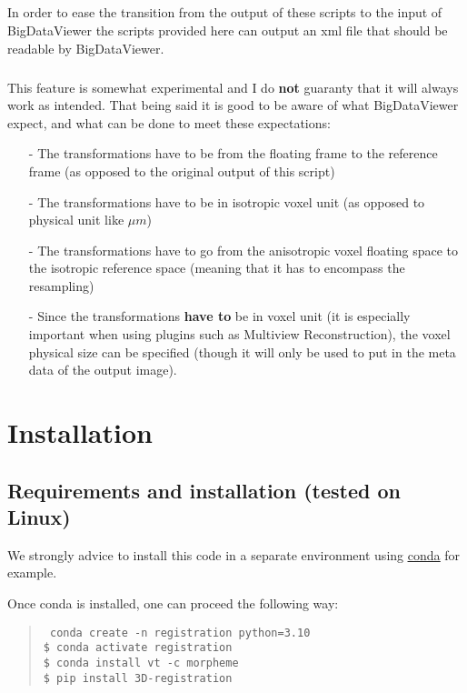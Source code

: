 \documentclass[10pt,a4paper]{book}
\newenvironment{code}[1]{\mbox{}\\[1ex]\hspace*{-#1cm}\begin{minipage}{150mm}\begin{quote}\tt}{\end{quote}\end{minipage}\mbox{}\\[1ex]}
\begin{document}
\paragraph{}In order to ease the transition from the output of these scripts to the input of BigDataViewer the scripts provided here can output an xml file that should be readable by BigDataViewer.
\paragraph{}This feature is somewhat experimental and I do \textbf{not} guaranty that it will always work as intended. That being said it is good to be aware of what BigDataViewer expect, and what can be done to meet these expectations:
\begin{itemize}
\item[-] The transformations have to be from the floating frame to the reference frame (as opposed to the original output of this script)
\item[-] The transformations have to be in isotropic voxel unit (as opposed to physical unit like $\mu m$)
\item[-] The transformations have to go from the anisotropic voxel floating space to the isotropic reference space (meaning that it has to encompass the resampling)
\item[-] Since the transformations \textbf{have to} be in voxel unit (it is especially important when using plugins such as Multiview Reconstruction), the voxel physical size can be specified (though it will only be used to put in the meta data of the output image).
\end{itemize}
\chapter{Installation}
\section{Requirements and installation (tested on Linux)}
We strongly advice to install this code in a separate environment using \underline{\href{https://conda.io/projects/conda/en/latest/user-guide/install/index.html}{conda}} for example.

Once conda is installed, one can proceed the following way:
\begin{code}{0.8}
\$ conda create -n registration python=3.10\\
\$ conda activate registration\\
\$ conda install vt -c morpheme\\
\$ pip install 3D-registration\\
\end{code}
\end{document}
